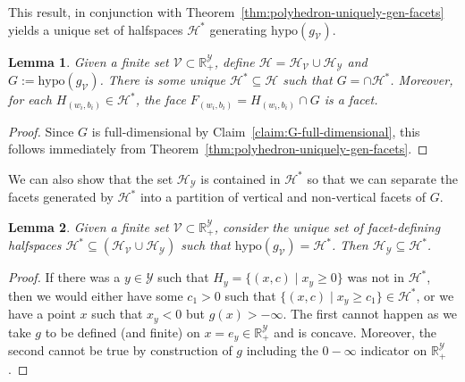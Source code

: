 \documentclass[11pt]{article}
\newcommand{\Comments}{1}
\newcommand{\mynote}[2]{\ifnum\Comments=1\textcolor{#1}{#2}\fi}
\newcommand{\raf}[1]{\mynote{darkgreen}{[RF: #1]}}
\newcommand{\reals}{\mathbb{R}}
\renewcommand{\H}{\mathcal{H}}
\newcommand{\V}{\mathcal{V}}
\newcommand{\Y}{\mathcal{Y}}
\newcommand{\inprod}[2]{\langle #1, #2 \rangle}%
\newcommand{\hyp}{\mathrm{hypo}}
\newtheorem{lemma}{Lemma}
\begin{document}
This result, in conjunction with Theorem~\ref{thm:polyhedron-uniquely-gen-facets} yields a unique set of halfspaces $\H^*$ generating $\hyp(g_\V)$.

\begin{lemma}\label{lem:G-unique-facets-Hstar}
  Given a finite set $\V \subset \reals^\Y_+$, define $\H = \H_\V \cup \H_\Y$ and $G := \hyp(g_\V)$.
  There is some unique $\H^* \subseteq \H$ such that $G = \cap \H^*$. 
  Moreover, for each $H_{(w_i, b_i)} \in\H^*$, the face $F_{(w_i, b_i)} = H_{(w_i, b_i)} \cap G$ is a facet.
\end{lemma}
\begin{proof}
  Since $G$ is full-dimensional by Claim~\ref{claim:G-full-dimensional}, this follows immediately from Theorem~\ref{thm:polyhedron-uniquely-gen-facets}.
\end{proof}
We can also show that the set $\H_\Y$ is contained in $\H^*$ so that we can separate the facets generated by $\H^*$ into a partition of vertical and non-vertical facets of $G$.

\begin{lemma}\label{lem:HY-subset-Hstar}
  Given a finite set $\V \subset \reals^\Y_+$, consider the unique set of facet-defining halfspaces $\H^* \subseteq (\H_\V \cup \H_\Y)$ such that $\hyp(g_\V) = \H^*$.
  Then $\H_\Y \subseteq \H^*$.
\end{lemma}
\begin{proof}
  If there was a $y \in \Y$ such that $H_y = \{(x,c) \mid x_y \geq 0\}$ was not in $\H^*$, then we would either have some $c_1 > 0$ such that $\{(x,c) \mid x_y \geq c_1\} \in \H^*$, or we have a point $x$ such that $x_y < 0$ but $g(x) > -\infty$.
  The first cannot happen as we take $g$ to be defined (and finite) on $x = e_y \in \reals^\Y_+$ and is concave.
  Moreover, the second cannot be true by construction of $g$ including the $0-\infty$ indicator on $\reals^\Y_+$.	
\end{proof}
\end{document}
